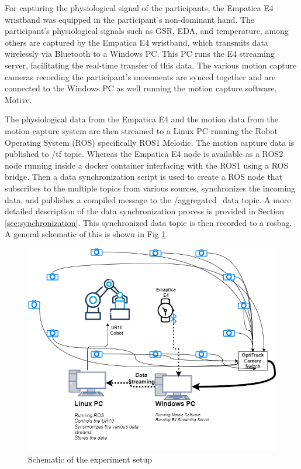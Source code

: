 For capturing the physiological signal of the participants, the Empatica E4 wristband was equipped in the participant's non-dominant hand. The participant's physiological signals such as \gls{GSR}, \gls{EDA},  and temperature, among others are captured by the Empatica E4 wristband, which transmits data wirelessly via Bluetooth to a Windows PC. This PC runs the E4 streaming server, facilitating the real-time transfer of this data. The various motion capture cameras recording the participant's movements are synced  together and are connected to the Windows PC as well running the motion capture software, Motive. 

The physiological data from the Empatica E4 and the motion data from the motion capture system are then streamed to a Linux PC running the Robot Operating System (ROS) specifically ROS1 Melodic.
The motion capture data is published to /tf topic. Whereas the Empatica E4 node is available as a ROS2 node running inside a docker container interfacing with the ROS1 using a ROS bridge.
Then a data synchronization script is used to create a ROS node that subscribes to the multiple topics from various sources, synchronizes the incoming data, and publishes a compiled message to the /aggregated\_data topic. A more detailed description of the data synchronization process is provided in Section \ref{sec:synchronization}.
This synchronized data topic is then recorded to a rosbag. A general schematic of this is shown in Fig \ref{fig:netwrok}.


\begin{figure}[h]
	\centering
	\includegraphics[width=0.9\columnwidth]{images/network2.png}
	\caption{Schematic of the experiment setup}
	\label{fig:netwrok}
\end{figure}



